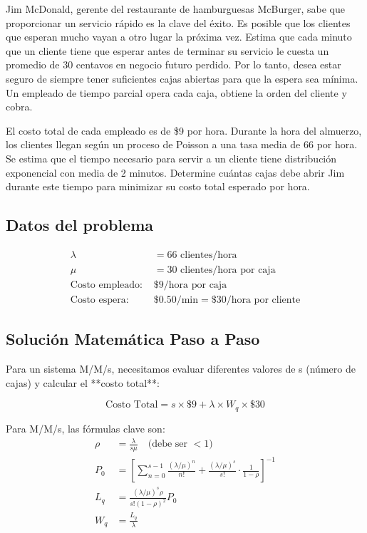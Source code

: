 \documentclass[12pt, a4paper, oneside]{book}
\theoremstyle{definition}
\begin{document}
Jim McDonald, gerente del restaurante de hamburguesas McBurger, sabe que proporcionar un servicio rápido es la clave del éxito. Es posible que los clientes que esperan mucho vayan a otro lugar la próxima vez. Estima que cada minuto que un cliente tiene que esperar antes de terminar su servicio le cuesta un promedio de 30 centavos en negocio futuro perdido. Por lo tanto, desea estar seguro de siempre tener suficientes cajas abiertas para que la espera sea mínima. Un empleado de tiempo parcial opera cada caja, obtiene la orden del cliente y cobra.
\par
El costo total de cada empleado es de \$9 por hora. Durante la hora del almuerzo, los clientes llegan según un proceso de Poisson a una tasa media de 66 por hora. Se estima que el tiempo necesario para servir a un cliente tiene distribución exponencial con media de 2 minutos. Determine cuántas cajas debe abrir Jim durante este tiempo para minimizar su costo total esperado por hora.

\subsection{Datos del problema}
\begin{align*}
\lambda &= 66 \text{ clientes/hora} \\
\mu &= 30 \text{ clientes/hora por caja} \\
\text{Costo empleado: } &\$9\text{/hora por caja} \\
\text{Costo espera: } &\$0.50\text{/min} = \$30\text{/hora por cliente}
\end{align*}

\subsection{Solución Matemática Paso a Paso}

Para un sistema M/M/s, necesitamos evaluar diferentes valores de s (número de cajas) y calcular el **costo total**:

$$\text{Costo Total} = s \times \$9 + \lambda \times W_q \times \$30$$

Para M/M/s, las fórmulas clave son:
\begin{align*}
\rho &= \frac{\lambda}{s \mu} \quad \text{(debe ser } < 1\text{)} \\
P_0 &= \left[\sum_{n=0}^{s-1} \frac{(\lambda/\mu)^n}{n!} + \frac{(\lambda/\mu)^s}{s!} \cdot \frac{1}{1-\rho}\right]^{-1} \\
L_q &= \frac{(\lambda/\mu)^s \rho}{s!(1-\rho)^2} P_0 \\
W_q &= \frac{L_q}{\lambda}
\end{align*}
\end{document}
